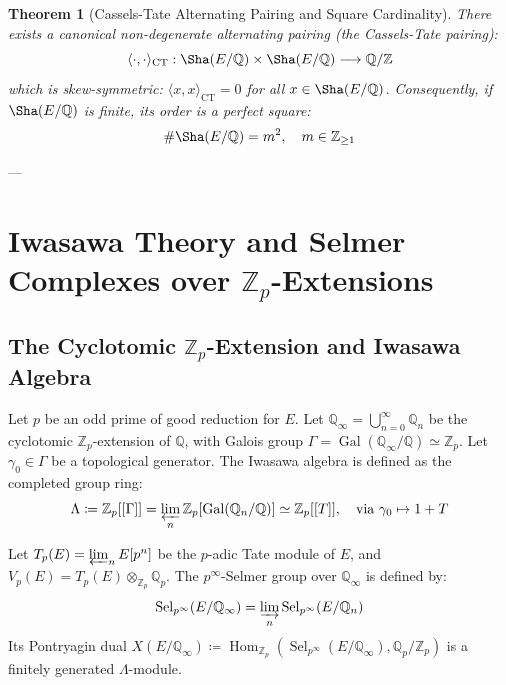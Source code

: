 \documentclass[11pt,a4paper]{article}
\newtheorem{theorem}{Theorem}[section]
\theoremstyle{definition}
\begin{document}
\begin{theorem}[Cassels-Tate Alternating Pairing and Square Cardinality]
There exists a canonical non-degenerate alternating pairing (the Cassels-Tate pairing):
\begin{equation}
\langle \cdot, \cdot \rangle_{\mathrm{CT}} : \Sha(E/\mathbb{Q}) \times \Sha(E/\mathbb{Q}) \longrightarrow \mathbb{Q}/\mathbb{Z}
\end{equation}
which is skew-symmetric: $\langle x, x \rangle_{\mathrm{CT}} = 0$ for all $x \in \Sha(E/\mathbb{Q})$. Consequently, if $\Sha(E/\mathbb{Q})$ is finite, its order is a perfect square:
\begin{equation}
\#\Sha(E/\mathbb{Q}) = m^2, \quad m \in \mathbb{Z}_{\ge 1}
\end{equation}
\end{theorem}

---

\section{\texorpdfstring{Iwasawa Theory and Selmer Complexes over $\mathbb{Z}_p$-Extensions}{Iwasawa Theory and Selmer Complexes over Zp-Extensions}}

\subsection{\texorpdfstring{The Cyclotomic $\mathbb{Z}_p$-Extension and Iwasawa Algebra}{The Cyclotomic Zp-Extension and Iwasawa Algebra}}
Let $p$ be an odd prime of good reduction for $E$. Let $\mathbb{Q}_\infty = \bigcup_{n=0}^\infty \mathbb{Q}_n$ be the cyclotomic $\mathbb{Z}_p$-extension of $\mathbb{Q}$, with Galois group $\Gamma = \operatorname{Gal}(\mathbb{Q}_\infty/\mathbb{Q}) \simeq \mathbb{Z}_p$. Let $\gamma_0 \in \Gamma$ be a topological generator.
The Iwasawa algebra is defined as the completed group ring:
\begin{equation}
\Lambda \coloneqq \mathbb{Z}_p[[\Gamma]] = \varprojlim_n \mathbb{Z}_p[\operatorname{Gal}(\mathbb{Q}_n/\mathbb{Q})] \simeq \mathbb{Z}_p[[T]], \quad \text{via } \gamma_0 \mapsto 1 + T
\end{equation}

Let $T_p(E) = \varprojlim_n E[p^n]$ be the $p$-adic Tate module of $E$, and $V_p(E) = T_p(E) \otimes_{\mathbb{Z}_p} \mathbb{Q}_p$.
The $p^\infty$-Selmer group over $\mathbb{Q}_\infty$ is defined by:
\begin{equation}
\operatorname{Sel}_{p^\infty}(E/\mathbb{Q}_\infty) = \varinjlim_n \operatorname{Sel}_{p^\infty}(E/\mathbb{Q}_n)
\end{equation}
Its Pontryagin dual $X(E/\mathbb{Q}_\infty) \coloneqq \operatorname{Hom}_{\mathbb{Z}_p}(\operatorname{Sel}_{p^\infty}(E/\mathbb{Q}_\infty), \mathbb{Q}_p/\mathbb{Z}_p)$ is a finitely generated $\Lambda$-module.
\end{document}

